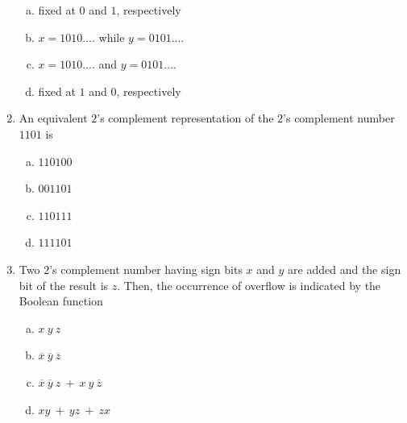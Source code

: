 \documentclass[journal,12pt,twocolumn]{IEEEtran}
\begin{document}
\begin{enumerate}
\begin{figure}
\caption{}

\label{fig:6}

\end{figure} 


\begin{enumerate}[(a)]

\item fixed at $0$ and $1$, respectively

\item $x=1010....$ while $y=0101....$

\item $x=1010....$ and $y=0101....$

\item fixed at $1$ and $0$, respectively


\end{enumerate}


\item An equivalent $2$'s complement representation of the $2$'s complement number $1101$ is

\begin{enumerate}[(a)]

\item $110100
$

\item $
001101
$

\item $
110111
$

\item $
111101
$

\end{enumerate}

\item Two $2$'s complement number having sign bits $x$ and $y$ are added and the sign bit of the result is $z$. Then, the occurrence of overflow is indicated by the Boolean function

\begin{enumerate}[(a)]

\item $ x \ y \ z $

\item $ \overline{x} \ \overline{y} \ \overline{z} $

\item $ \overline{x} \ \overline{y} \ z \ + \ x \ y \ \overline{z}$

\item $ xy \ + \ yz \ + \ zx $

\end{enumerate}



\end{enumerate}
\end{document}
